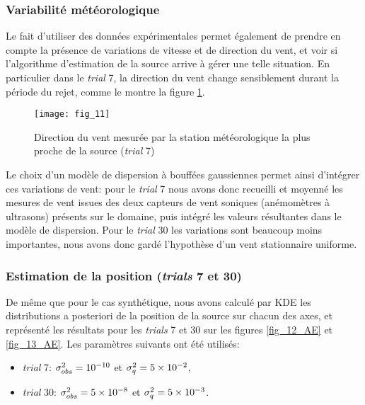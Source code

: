 \subsubsection{Variabilité météorologique}

Le fait d'utiliser des données expérimentales permet également de prendre en compte la présence de variations de vitesse et de direction du vent, et voir si l'algorithme d'estimation de la source arrive à gérer une telle situation. En particulier dans le \textit{trial} 7, la direction du vent change sensiblement durant la période du rejet, comme le montre la figure \ref{fig_11_AE}.

\begin{figure}[h!]
	\centering
	\texttt{[image: fig\_11]}
	\caption{Direction du vent mesurée par la station météorologique la plus proche de la source (\textit{trial} 7)}
	\label{fig_11_AE}
\end{figure}

Le choix d'un modèle de dispersion à bouffées gaussiennes permet ainsi d'intégrer ces variations de vent: pour le \textit{trial} 7 nous avons donc recueilli et moyenné les mesures de vent issues des deux capteurs de vent soniques (anémomètres à ultrasons) présents sur le domaine, puis intégré les valeurs résultantes dans le modèle de dispersion. Pour le \textit{trial} 30 les variations sont beaucoup moins importantes, nous avons donc gardé l'hypothèse d'un vent stationnaire uniforme. \\

\subsubsection{Estimation de la position (\textit{trials} 7 et 30)}

De même que pour le cas synthétique, nous avons calculé par KDE les distributions a posteriori de la position de la source sur chacun des axes, et représenté les résultats pour les \textit{trials} 7 et 30 sur les figures \ref{fig_12_AE} et \ref{fig_13_AE}. Les paramètres suivants ont été utilisés:

\begin{itemize}
	\item \textit{trial} 7: ${\sigma_{obs}^2} = 10^{-10}$ et $\sigma_q^2 = 5\times 10^{-2}$,
	\item \textit{trial} 30: ${\sigma_{obs}^2} = 5 \times 10^{-8}$ et $\sigma_q^2 = 5\times 10^{-3}$.\\
\end{itemize}

